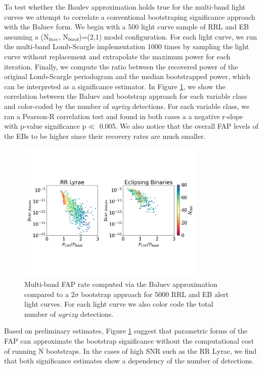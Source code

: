 \documentclass[DM,authoryear,toc]{lsstdoc}
\begin{document}
To test whether the Baulev approximation holds true for the multi-band light curves we attempt to correlate a conventional bootstraping significance approach with the Baluev form. We begin with a 500 light curve sample of RRL and EB assuming a (N$_{base}$, N$_{band}$)=(2,1) model configuration. For each light curve, we run the multi-band Lomb-Scargle implementation 1000 times by sampling the light curve without replacement and extrapolate the maximum power for each iteration. Finally, we compute the ratio between the recovered power of the original Lomb-Scargle periodogram and the median bootstrapped power, which can be interpreted as a significance estimator. In Figure \ref{fig:boot}, we show the correlation between the Baluev and bootstrap approach for each variable class and color-coded by the number of \textit{ugrizy} detections. For each variable class, we ran a Pearson-R correlation test and found in both cases a a negative r-slope with p-value significance p$\ll$ 0.005. We also notice that the overall FAP levels of the EBs to be higher since their recovery rates are much smaller. 

\begin{figure}
  \includegraphics[width=0.8\textwidth]{figures/fap_approximation_mlsp.pdf}
  \centering 
  \caption{Multi-band FAP rate computed via the Baluev approximation compared to a $2\sigma$ bootstrap approach for 5000 RRL and EB alert light curves. For each light curve we also color code the total number of $ugrizy$ detections.}
  \label{fig:boot}
\end{figure}

Based on preliminary estimates, Figure \ref{fig:boot} suggest that parametric forms of the FAP can approximate the bootstrap significance without the computational cost of running N bootstraps. In the cases of high SNR such as the RR Lyrae, we find that both significance estimates show a dependency of the number of detections. 
\end{document}
